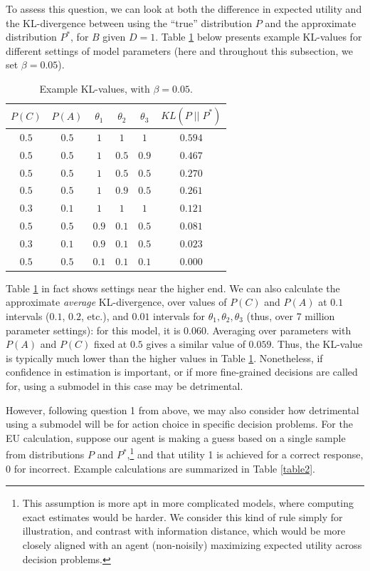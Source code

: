 \documentclass[10pt,letterpaper]{article}
\begin{document}
To assess this question, we can look at both the difference in expected utility and the KL-divergence between using the ``true'' distribution $P$ and the approximate distribution $P^*$, for $B$ given $D=1$. Table \ref{table1} below presents example KL-values for different settings of model parameters (here and throughout this subsection, we set $\beta = 0.05$).

\begin{table}[h]  \begin{center}
\begin{tabular}{c | c | c | c | c || c}
 $P(C)$ & $P(A)$ & $\theta_1$ & $\theta_2$ & $\theta_3$ & $KL(P \;\vert\vert\; P^*)$ \\ \hline
 $0.5$ & $0.5$ & $1$ & $1$ & $1$  & $0.594$ \\
  $0.5$ & $0.5$ & $1$ & $0.5$ & $0.9$  & $0.467$ \\
  $0.5$ & $0.5$ &$1$ & $0.5$ & $0.5$  & $0.270$ \\
 $0.5$ & $0.5$ & $1$ & $0.9$ & $0.5$  & $0.261$ \\
  $0.3$ & $0.1$ & $1$ & $1$ & $1$ & $0.121$ \\
 $0.5$ & $0.5$ &  $0.9$ & $0.1$ & $0.5$  & $0.081$ \\
  $0.3$ & $0.1$ & $0.9$ & $0.1$ & $0.5$ & $0.023$ \\
 $0.5$ & $0.5$ & $0.1$ & $0.1$ & $0.1$ & $0.000$ 
\end{tabular} \end{center} \caption{Example KL-values, with $\beta = 0.05$.} \label{table1}
\end{table}
Table \ref{table1} in fact shows settings near the higher end. We can also calculate the approximate \emph{average} KL-divergence, over values of $P(C)$ and $P(A)$ at $0.1$ intervals ($0.1$, $0.2$, etc.), and $0.01$ intervals for $\theta_1,\theta_2,\theta_3$ (thus, over 7 million parameter settings): for this model, it is $0.060$. Averaging over parameters with $P(A)$ and $P(C)$ fixed at $0.5$ gives a similar value of $0.059$.
Thus, the KL-value is typically much lower than the higher values in Table \ref{table1}. Nonetheless, if confidence in estimation is important, or if more fine-grained decisions are called for, using a submodel in this case may be detrimental. 

However, following question 1 from above, we may also consider how detrimental using a submodel will be for action choice in specific decision problems.
For the EU calculation, suppose our agent is making a guess based on a single sample from distributions $P$ and $P^*$,\footnote{This assumption is more apt in more complicated models, where computing exact estimates would be harder. We consider this kind of rule simply for illustration, and contrast with information distance, which would be more closely aligned with an agent (non-noisily) maximizing expected utility across decision problems.\label{fn}} and that utility 1 is achieved for a correct response, 0 for incorrect. Example calculations are summarized in Table \ref{table2}.
\end{document}
